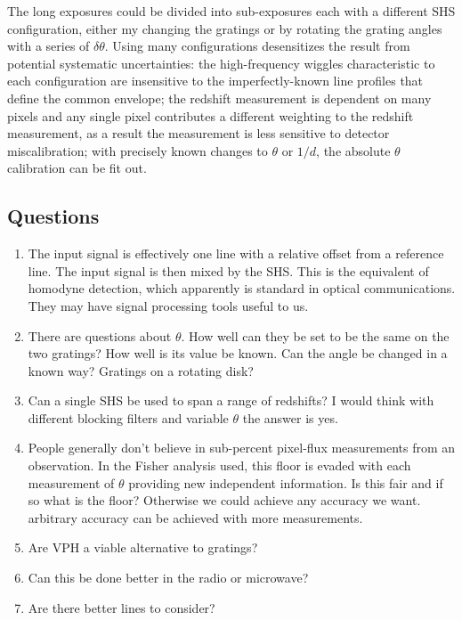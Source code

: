 \documentclass[preprint]{aastex}
\begin{document}
The long exposures could be divided into sub-exposures each with a different SHS configuration, either my changing the
gratings or by rotating the grating angles with a series of $\delta \theta$.
Using many configurations desensitizes the result from potential systematic uncertainties:
the high-frequency wiggles characteristic to each configuration
are insensitive to the imperfectly-known line profiles that define the common envelope;
the redshift measurement is dependent on many pixels and any single pixel contributes a different weighting to the redshift measurement,
as a result the measurement  is less sensitive to
detector miscalibration; with precisely known changes to $\theta$ or $1/d$, the absolute $\theta$ calibration can
be fit out. 



\subsection{Questions}
\begin{enumerate}
\item The input signal is effectively one line with a relative offset from a reference line.  The input signal is then mixed by the SHS.
This is the equivalent of homodyne detection, which apparently is standard in optical communications.  They may have signal
processing tools useful to us.
\item There are questions about $\theta$.  How well can they be set to be the same on the two gratings?  How well is its value be known.
Can the angle be changed in a known way?  Gratings on a rotating disk?
\item Can a single SHS be used to span a range of redshifts?  I would think with different blocking filters and variable $\theta$ the answer is yes.
\item People generally don't believe in sub-percent pixel-flux measurements  from an observation.  In the Fisher analysis used, this floor is evaded with each measurement of $\theta$ providing new independent information.  Is this fair and if so what is the floor?  Otherwise we could achieve any accuracy we want.
arbitrary accuracy can be achieved with more measurements.
\item Are VPH a viable alternative to gratings?
\item Can this be done better in the radio or microwave?
\item Are there better lines to consider?
\end{enumerate}



\end{document}
